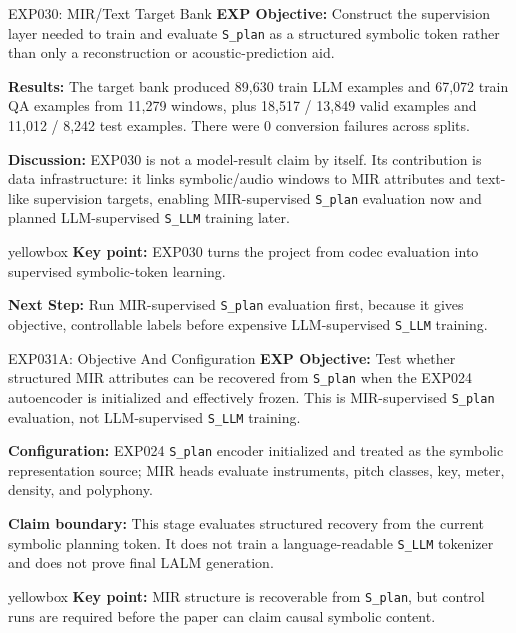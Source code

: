 \documentclass[aspectratio=169,11pt]{beamer}
\newcommand{\code}[1]{\texttt{\footnotesize #1}}
\newcommand{\expfield}[2]{\textbf{#1:} #2\par\vspace{0.10cm}}
\newenvironment{keybox}{%
  \begin{beamercolorbox}[rounded=true,sep=0.14cm,wd=\linewidth]{yellowbox}\footnotesize%
}{%
  \end{beamercolorbox}%
}
\begin{document}
\begin{frame}{EXP030: MIR/Text Target Bank}
  \footnotesize
  \expfield{EXP Objective}{Construct the supervision layer needed to train and evaluate \code{S\_plan} as a structured symbolic token rather than only a reconstruction or acoustic-prediction aid.}
  \expfield{Results}{The target bank produced 89,630 train LLM examples and 67,072 train QA examples from 11,279 windows, plus 18,517 / 13,849 valid examples and 11,012 / 8,242 test examples. There were 0 conversion failures across splits.}
  \expfield{Discussion}{EXP030 is not a model-result claim by itself. Its contribution is data infrastructure: it links symbolic/audio windows to MIR attributes and text-like supervision targets, enabling MIR-supervised \code{S\_plan} evaluation now and planned LLM-supervised \code{S\_LLM} training later.}
  \begin{keybox}\textbf{Key point:} EXP030 turns the project from codec evaluation into supervised symbolic-token learning.\end{keybox}
  \vspace{0.18cm}
  \expfield{Next Step}{Run MIR-supervised \code{S\_plan} evaluation first, because it gives objective, controllable labels before expensive LLM-supervised \code{S\_LLM} training.}
\end{frame}

\begin{frame}{EXP031A: Objective And Configuration}
  \footnotesize
  \expfield{EXP Objective}{Test whether structured MIR attributes can be recovered from \code{S\_plan} when the EXP024 autoencoder is initialized and effectively frozen. This is MIR-supervised \code{S\_plan} evaluation, not LLM-supervised \code{S\_LLM} training.}
  \expfield{Configuration}{EXP024 \code{S\_plan} encoder initialized and treated as the symbolic representation source; MIR heads evaluate instruments, pitch classes, key, meter, density, and polyphony.}
  \expfield{Claim boundary}{This stage evaluates structured recovery from the current symbolic planning token. It does not train a language-readable \code{S\_LLM} tokenizer and does not prove final LALM generation.}
  \begin{keybox}\textbf{Key point:} MIR structure is recoverable from \code{S\_plan}, but control runs are required before the paper can claim causal symbolic content.\end{keybox}
\end{frame}
\end{document}
